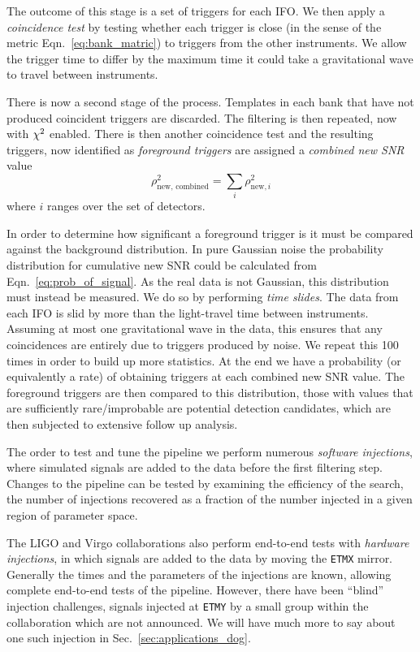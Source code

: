 The outcome of this stage is a set of triggers for each IFO.  We then
apply a \emph{coincidence test} by testing whether each trigger is
close (in the sense of the metric Eqn.~\ref{eq:bank_matric}) to
triggers from the other instruments.  We allow the trigger time to
differ by the maximum time it could take a gravitational wave to
travel between instruments.

There is now a second stage of the process.  Templates in each bank
that have not produced coincident triggers are discarded.  The
filtering is then repeated, now with $\chi^2$ enabled.  There is then
another coincidence test and the resulting triggers, now identified as
\emph{foreground triggers} are assigned a \emph{combined new SNR}
value
%
\begin{equation*}
\rho_{\textrm{new, combined}}^2 = \sum_i \rho_{\textrm{new}, i}^2
\end{equation*}
%
where $i$ ranges over the set of detectors.

In order to determine how significant a foreground trigger is it must
be compared against the background distribution.  In pure Gaussian
noise the probability distribution for cumulative new SNR could be
calculated from Eqn.~\ref{eq:prob_of_signal}.  As the real data is
not Gaussian, this distribution must instead be measured.  We do so by
performing \emph{time slides}.  The data from each IFO is slid by more
than the light-travel time between instruments.  Assuming at most one
gravitational wave in the data, this ensures that any coincidences are
entirely due to triggers produced by noise.  We repeat this 100 times
in order to build up more statistics.  At the end we have a
probability (or equivalently a rate) of obtaining triggers at each
combined new SNR value.  The foreground triggers are then compared to
this distribution, those with values that are sufficiently
rare/improbable are potential detection candidates, which are then
subjected to extensive follow up analysis.

The order to test and tune the pipeline we perform numerous
\emph{software injections}, where simulated signals are added to the
data before the first filtering step.  Changes to the pipeline can be
tested by examining the efficiency of the search, the number of
injections recovered as a fraction of the number injected in a given
region of parameter space.

The LIGO and Virgo collaborations also perform end-to-end tests with
\emph{hardware injections}, in which signals are added to the data by
moving the \texttt{ETMX} mirror.  Generally the times and the
parameters of the injections are known, allowing complete end-to-end
tests of the pipeline.  However, there have been ``blind'' injection
challenges, signals injected at \texttt{ETMY} by a small group within
the collaboration which are not announced.  We will have much more to
say about one such injection in Sec.~\ref{sec:applications_dog}.


